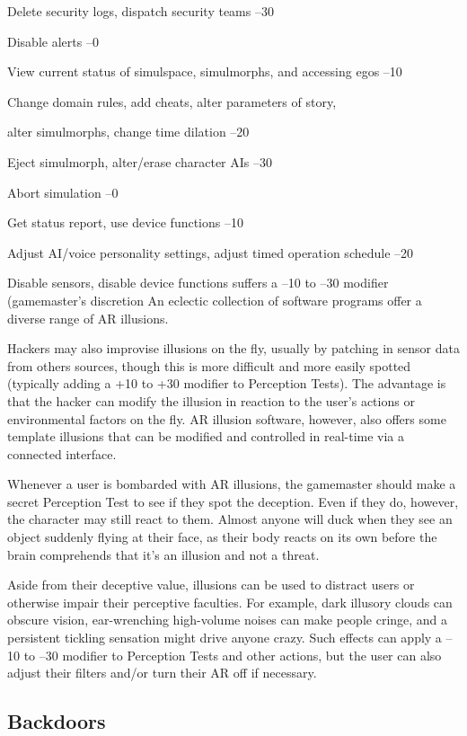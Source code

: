 Delete security logs, dispatch security teams
–30

Disable alerts
–0

View current status of simulspace, simulmorphs, and accessing egos
–10

Change domain rules, add cheats, alter parameters of story, 

alter simulmorphs, change time dilation
–20

Eject simulmorph, alter/erase character AIs
–30

Abort simulation
–0

Get status report, use device functions
–10

Adjust AI/voice personality settings, adjust timed operation schedule
–20

Disable sensors, disable device functions
suffers a –10 to –30 modifier (gamemaster's discretion
An eclectic collection of software programs
offer a diverse range of AR illusions.

Hackers may also improvise illusions on the 
fly, usually by patching in sensor data from others 
sources, though this is more difficult and more easily 
spotted (typically adding a +10 to +30 modifier to 
Perception Tests). The advantage is that the hacker 
can modify the illusion in reaction to the user's actions
or environmental factors on the fly. AR illusion
software, however, also offers some template illusions 
that can be modified and controlled in real-time via a 
connected interface.

Whenever a user is bombarded with AR illusions, the 
gamemaster should make a secret Perception Test to see 
if they spot the deception. Even if they do, however, the 
character may still react to them. Almost anyone will 
duck when they see an object suddenly flying at their 
face, as their body reacts on its own before the brain 
comprehends that it's an illusion and not a threat.

Aside from their deceptive value, illusions can be 
used to distract users or otherwise impair their perceptive
faculties. For example, dark illusory clouds can
obscure vision, ear-wrenching high-volume noises can 
make people cringe, and a persistent tickling sensation 
might drive anyone crazy. Such effects can apply a –10 
to –30 modifier to Perception Tests and other actions, 
but the user can also adjust their filters and/or turn 
their AR off if necessary.

\subsection{Backdoors}

